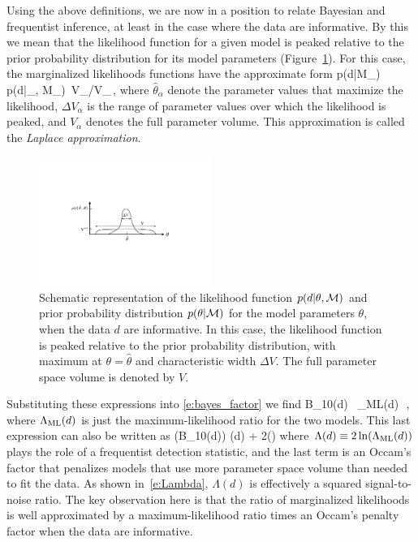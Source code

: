 Using the above definitions, we are now in a position to 
relate Bayesian and frequentist inference, at least in the 
case where the data are informative.
By this we mean that the likelihood function for a given
model is peaked relative to the prior probability 
distribution for its model parameters 
(Figure~\ref{f:informative_data}).
For this case, the marginalized likelihoods functions 
have the approximate form 
%
\be
p(d|{\cal M}_\alpha) 
\simeq
p(d|\hat\theta_\alpha, {\cal M}_\alpha)
\,{\Delta V_\alpha}/{V_\alpha}\,,
\ee
%
where $\hat\theta_\alpha$ denote the parameter values that
maximize the likelihood, $\Delta V_\alpha$ is the range of
parameter values over which the likelihood is peaked, and 
$V_\alpha$ denotes the full parameter volume.
This approximation is called the {\em Laplace approximation}.
%
\begin{figure}[htbp!]
\begin{center}
\includegraphics[width=0.5\textwidth]{Figures/informative_data}
\caption{Schematic representation of the likelihood function 
$p(d|\theta,{\cal M})$ and prior probability distribution 
$p(\theta|{\cal M})$ for the model parameters $\theta$,
when the data $d$ are informative.
In this case, the likelihood function is peaked relative to the 
prior probability distribution, with maximum at 
$\theta=\hat\theta$ and characteristic width $\Delta V$.
The full parameter space volume is denoted by $V$.}
\label{f:informative_data}
\end{center}
\end{figure}
%
Substituting these expressions into \eqref{e:bayes_factor} we find
%
\be
{\cal B}_{10}(d) 
\equiv{}
\simeq {}
\,
\simeq\Lambda_{\rm ML}(d)
\,\,,
\ee
where $\Lambda_{\rm ML}(d)$ is just the maximum-likelihood
ratio for the two models.
This last expression can also be written as
%
\ln({\cal B}_{10}(d)) \simeq \Lambda(d) + 
2\ln\left(\right)
\label{e:BF-SNR}
\ee
%
where $\Lambda(d)\equiv 2\ln(\Lambda_{\rm ML}(d))$
plays the role of a frequentist detection statistic, 
and the last term is an Occam's factor that penalizes
models that use more parameter space volume than needed
to fit the data.
As shown in~\eqref{e:Lambda}, $\Lambda(d)$ is effectively
a squared signal-to-noise ratio.
The key observation here is that the ratio of marginalized
likelihoods is well approximated by a maximum-likelihood 
ratio times an Occam's penalty factor when the data are informative.


